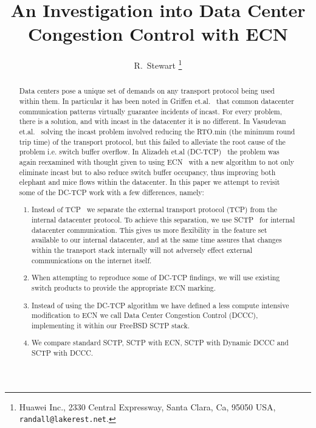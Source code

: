 \documentclass[12pt]{article}
\begin{document}
%
%
\title{An Investigation into Data Center Congestion Control with ECN}
\author{R.~Stewart%
        \thanks{Huawei Inc.,
                2330 Central Expressway,
                Santa Clara, Ca, 95050
                USA,
                \texttt{randall@lakerest.net}.}
}

\maketitle


\begin{abstract}
Data centers pose a unique set of demands on any transport protocol being used
within them. In particular it has been noted in Griffen et.al.~\cite{griffen} that common datacenter
communication patterns virtually guarantee incidents of incast. For every problem, there is a solution,
and with incast in the datacenter it is no different. In Vasudevan et.al.~\cite{vasudevan} solving the incast
problem involved reducing the RTO.min (the minimum round trip time) of the transport protocol, but
this failed to alleviate the root cause of the problem i.e. switch buffer overflow. In Alizadeh et.al (DC-TCP)~\cite{alizadeh} the problem
was again reexamined with thought given to using ECN~\cite{rfc3168}  with a new algorithm to not only eliminate
incast but to also reduce switch buffer occupancy, thus improving both elephant and mice flows
within the datacenter. In this paper we attempt to revisit some of the DC-TCP  work with a few differences, namely:

\begin{enumerate}
 \item  Instead of TCP~\cite{rfc793}  we separate the external transport protocol (TCP) from the internal datacenter protocol.
 To achieve this separation,  we use SCTP~\cite{rfc4960} for internal datacenter communication. This gives us more flexibility in the feature set available to our internal datacenter, and at the same
 time assures that changes within the transport stack internally will not adversely effect external communications on
 the internet itself.
\item  When attempting to reproduce some of DC-TCP findings, we will use existing switch products
to provide the appropriate ECN marking.
\item Instead of using the DC-TCP algorithm we have defined a less compute intensive modification
to ECN we call Data Center Congestion Control (DCCC), implementing it within our FreeBSD SCTP stack.
\item We compare standard SCTP, SCTP with ECN, SCTP with Dynamic DCCC and SCTP with DCCC.
\end{enumerate}

\end{abstract}
\end{document}

